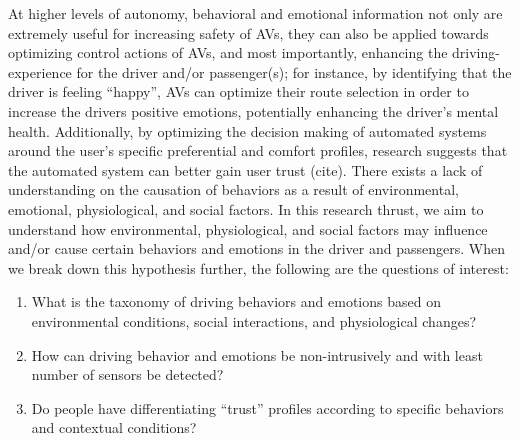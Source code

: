 At higher levels of autonomy, behavioral and emotional information not only are extremely useful for increasing safety of AVs, they can also be applied towards optimizing control actions of AVs, and most importantly, enhancing the  driving-experience for the driver and/or passenger(s); for instance, by identifying that the driver is feeling ``happy'', AVs can optimize their route selection in order to increase the drivers positive emotions, potentially enhancing the driver's mental health. 
Additionally, by optimizing the decision making of automated systems around the user's specific preferential and comfort profiles, research suggests that the automated system can better gain user trust (cite). 
There exists a lack of understanding on the causation of behaviors as a result of environmental, emotional, physiological, and social factors. %
In this research thrust, we aim to understand how environmental, physiological, and social factors may influence and/or cause certain behaviors and emotions in the driver and passengers. 
When we break down this hypothesis further, the following are the questions of interest:
\begin{enumerate}[itemsep=0pt,parsep=0pt,topsep=4pt,leftmargin=0.4in]
    \item What is the taxonomy of driving behaviors and emotions based on environmental conditions, social interactions, and physiological changes?
    \item How can driving behavior and emotions be non-intrusively and with least number of sensors be detected?
    \item Do people have differentiating “trust” profiles according to specific behaviors and contextual conditions?  
\end{enumerate}

